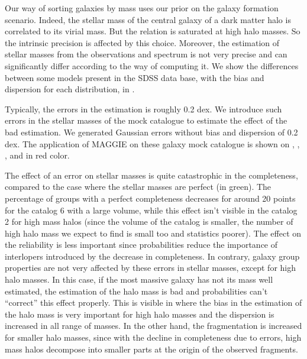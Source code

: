 Our way of sorting galaxies by mass uses our prior on the galaxy formation
scenario. Indeed, the stellar mass of the central galaxy of a dark matter halo
is correlated to its virial mass. But the relation is saturated at high halo
masses. So the intrinsic precision is affected by this choice. Moreover, the
estimation of stellar masses from the observations and spectrum is not very
precise and can significantly differ according to the way of computing it. We
show the differences between some models present in the SDSS data base, with
the bias and dispersion for each distribution, in .

Typically, the errors in the estimation is roughly 0.2 dex. We introduce such
errors in the stellar masses of the mock catalogue to estimate the effect of
the bad estimation. We generated Gaussian errors without bias and dispersion of
0.2 dex. The application of MAGGIE on these galaxy mock catalogue is shown on
, ,
,  and
 in red color.

The effect of an error on stellar masses is quite catastrophic in the
completeness, compared to the case where the stellar masses are perfect (in
green). The percentage of groups with a perfect completeness decreases for
around 20 points for the catalog 6 with a large volume, while this effect isn't
visible in the catalog 2 for high mass halos (since the volume of the catalog
is smaller, the number of high halo mass we expect to find is small too and
statistics poorer). The effect on the reliability is less important since
probabilities reduce the importance of interlopers introduced by the decrease
in completeness. In contrary, galaxy group properties are not very affected by
these errors in stellar masses, except for high halo masses. In this case, if
the most massive galaxy has not its mass well estimated, the estimation of the
halo mass is bad and probabilities can't ``correct'' this effect properly. This
is visible in  where the bias in the
estimation of the halo mass is very important for high halo masses and the
dispersion is increased in all range of masses. In the other hand, the
fragmentation is increased for smaller halo masses, since with the decline in
completeness due to errors, high mass halos decompose into smaller parts
at the origin of the observed fragments.

